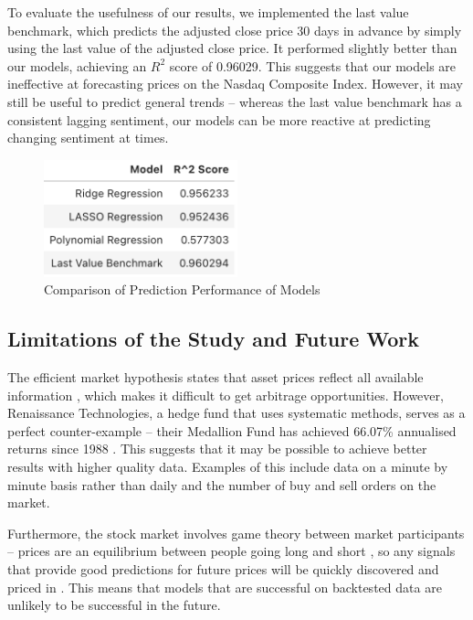 \documentclass[a4paper, 11pt]{article}
\begin{document}
To evaluate the usefulness of our results, we implemented the last value benchmark, which predicts the adjusted close price 30 days in advance by simply using the last value of the adjusted close price. It performed slightly better than our models, achieving an $R^2$ score of 0.96029. This suggests that our models are ineffective at forecasting prices on the Nasdaq Composite Index. However, it may still be useful to predict general trends -- whereas the last value benchmark has a consistent lagging sentiment, our models can be more reactive at predicting changing sentiment at times.

\begin{figure}[H]
    \begin{center}
        \includegraphics[width=0.5\textwidth]{Model Results Table.png}
        \caption{Comparison of Prediction Performance of Models}
    \end{center}
\end{figure}

\subsection{Limitations of the Study and Future Work}
The efficient market hypothesis states that asset prices reflect all available information \cite{fama1970efficient}, which makes it difficult to get arbitrage opportunities. However, Renaissance Technologies, a hedge fund that uses systematic methods, serves as a perfect counter-example -- their Medallion Fund has achieved 66.07\% annualised returns since 1988 \cite{cornell2020medallion}. This suggests that it may be possible to achieve better results with higher quality data. Examples of this include data on a minute by minute basis rather than daily and the number of buy and sell orders on the market.

Furthermore, the stock market involves game theory between market participants \cite{allen1998finance} -- prices are an equilibrium between people going long and short \cite{thakor1991game}, so any signals that provide good predictions for future prices will be quickly discovered and priced in \cite{carfi2011fair}. This means that models that are successful on backtested data are unlikely to be successful in the future.
\end{document}
